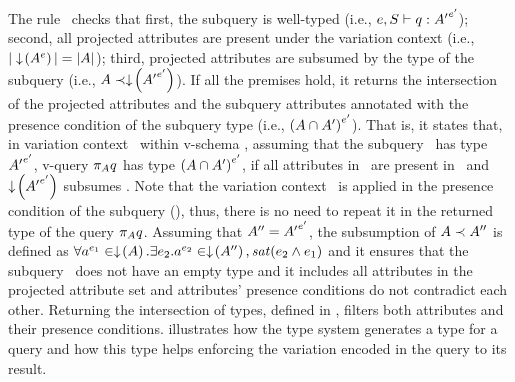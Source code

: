 % 
The rule \prjE\ 
checks that first, the subquery is well-typed (i.e., $\envPrime$);
second, all projected attributes are present under the variation context 
(i.e., $|\pushIn {\annot \vType}| = | \vType |$);
third, projected attributes are subsumed by the type of the subquery
(i.e., $\subsume { \vType}  {\pushIn {\annot [\VVal \vctx] {\VVal \vType}}}$).
If all the premises hold, it returns the intersection of the projected attributes
and the subquery attributes annotated with the presence condition of the
subquery type (i.e., ${\envInContext [\VVal \vctx] {\left(\vType \cap {\VVal \vType} \right)}}$).
%
That is, it states that, in variation context \vctx\ within v-schema \vSch, assuming 
that the subquery \vQ\ has type $\envInContext [\VVal \vctx] {\VVal \vType}$,
v-query $\pi_\vType \vQ$
has type \ensuremath {\envInContext [\VVal \vctx] {\left( \vType \cap \VVal \vType\right)}}, 
if all attributes in \vType\ are present in \vctx\
and
 \ensuremath {\pushIn {\envInContext [\VVal \vctx] {\VVal \vType}}} subsumes \vType.
%
Note that the variation context \dimMeta\ is applied in the presence condition of
the subquery (\VVal \dimMeta), thus, there is no need to repeat it in the returned 
type of the query $\pi_\vAttList \vQ$.
%
Assuming that $\VVVal \vType = \annot [\VVal \dimMeta] {\VVal \vType}$,
the subsumption of $\subsume \vType { \VVVal \vType}$ is defined as
\ensuremath{ \forall \annot [\dimMeta_1] \vAtt \in \pushIn {\vType}.
\exists \dimMeta_2. \annot [\dimMeta_2] \vAtt \in \pushIn {\VVVal \vType}, 
\sat {\dimMeta_2 \wedge  \dimMeta_1}} and it 
ensures that the subquery \vQ\ does not have an empty type
and it includes all attributes in 
the projected attribute set and attributes' presence conditions do not 
contradict each other. 
Returning the intersection of types, defined in 
\defref{vset-intersect}, filters both 
attributes and their presence conditions.
\exref{type} illustrates how the type system generates a type for a query
and how this type helps enforcing the variation encoded in the query to its result.



